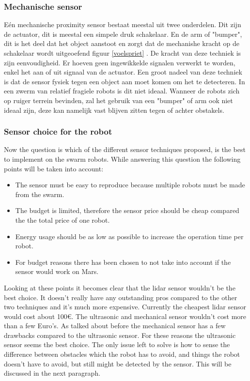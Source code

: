 \documentclass[10pt,a4paper]{article}
\begin{document}
\subsubsection{Mechanische sensor}
Eén mechanische proximity sensor bestaat meestal uit twee onderdelen. Dit zijn de actuator, dit is meestal een simpele druk schakelaar. En de arm of "bumper", dit is het deel dat het object aanstoot en zorgt dat de mechanishe kracht op de schakelaar wordt uitgeoefend figuur \ref{voelspriet} . De kracht van deze techniek is zijn eenvoudigheid. Er hoeven geen ingewikkelde signalen verwerkt te worden, enkel het aan of uit signaal van de actuator. Een groot nadeel van deze techniek is dat de sensor fysiek tegen een object aan moet komen om het te detecteren. In een zwerm van relatief fragiele robots is dit niet ideaal. Wanneer de robots zich op ruiger terrein bevinden, zal het gebruik van een "bumper" of arm ook niet ideaal zijn, deze kan namelijk vast blijven zitten tegen of achter obstakels.



\subsubsection{Sensor choice for the robot}
Now the question is which of the different sensor techniques proposed, is the best to implement on the swarm robots. While answering this question the following points will be taken into account:

\begin{itemize}
    \item The sensor must be easy to reproduce because multiple robots must be made from the swarm.
    \item The budget is limited, therefore the sensor price should be cheap compared the the total price of one robot.
    \item Energy usage should be as low as possible to increase the operation time per robot.
    \item For budget reasons there has been chosen to not take into account if the sensor would work on Mars.
\end{itemize}

Looking at these points it becomes clear that the lidar sensor wouldn't be the best choice. It doesn't really have any outstanding pros compared to the other two techniques and it's much more expensive. Currently the cheapest lidar sensor would cost about 100$\euro$. The ultrasonic and mechanical sensor wouldn't cost more than a few Euro's. As talked about before the mechanical sensor has a few drawbacks compared to the ultrasonic sensor. For these reasons the ultrasonic sensor seems the best choice. The only issue left to solve is how to sense the difference between obstacles which the robot has to avoid, and things the robot doesn't have to avoid, but still might be detected by the sensor. This will be discussed in the next paragraph.
\end{document}
